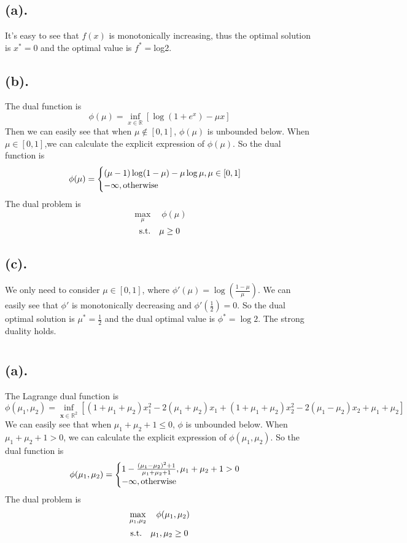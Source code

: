 \documentclass[12pt,letterpaper]{article}
\begin{document}
\section{}
\subsection*{(a).}
It’s easy to see that $f(x)$ is monotonically increasing, thus the optimal solution is $x^*=0$ and the optimal value is $f^*=$log2.
\subsection*{(b).}
The dual function is $$\phi (\mu)=\inf_{x\in\mathbb{R}}[\log(1+e^x)-\mu x]$$
Then we can easily see that when $\mu\notin [0,1]$, $\phi(\mu)$ is unbounded below. When $\mu\in [0,1]$,we can calculate the explicit expression of $\phi(\mu)$. So the dual function is 
$$\phi(\mu)=\begin{cases}(\mu-1)\log(1-\mu)-\mu\log\mu, \mu\in[0,1]\\
-\infty ,\rm otherwise
\end{cases}$$
The dual problem is $$\max_{\mu} \quad\phi(\mu) $$
$$\rm s.t. \quad \mu\geq \rm0$$
\subsection*{(c).}
We only need to consider $\mu\in[0,1]$, where $\phi'(\mu)=\log(\frac{1-\mu}{\mu})$. We can easily see that $\phi'$ is monotonically decreasing and $\phi'(\frac{1}{2})=0$. So the dual optimal solution is $\mu^*=\frac{1}{2}$ and the dual optimal value is $\phi^*=\log2$. The strong duality holds.
\section{}
\subsection*{(a).}
The Lagrange dual function is $$\phi(\mu_1,\mu_2)=\inf_{\boldsymbol{x}\in\mathbb{R}^2}[(1+\mu_1+\mu_2)x_1^2-2(\mu_1+\mu_2)x_1+(1+\mu_1+\mu_2)x_2^2-2(\mu_1-\mu_2)x_2+\mu_1+\mu_2]$$
We can easily see that when $\mu_1+\mu_2+1\leq0$, $\phi$ is unbounded below. When $\mu_1+\mu_2+1>0$, we can calculate the explicit expression of $\phi(\mu_1,\mu_2)$. So the dual function is $$
\phi(\mu_1,\mu_2)=
\begin{cases}1-\frac{(\mu_1-\mu_2)^2+1}{\mu_1+\mu_2+1}, \mu_1+\mu_2+1>0\\
-\infty, \rm otherwise
\end{cases}
$$
The dual problem is 
$$\max_{\mu_1,\mu_2}\quad \phi(\mu_1,\mu_2)\\$$
$$\rm s.t. \quad  \mu_1,\mu_2 \geq \rm 0$$
\end{document}
